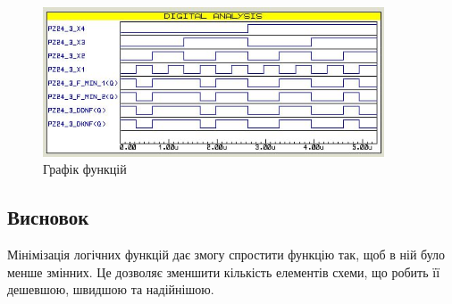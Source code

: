 \documentclass[12pt]{extarticle}
\begin{document}
\begin{figure}[H]
    \centering
    \includegraphics[width=0.90\textwidth]{graph.jpg}
    \caption{Графік функцій}
\end{figure}

\subsection*{Висновок}

Мінімізація логічних функцій дає змогу спростити функцію так, щоб 
в ній було менше змінних. Це дозволяє зменшити кількість елементів 
схеми, що робить її дешевшою, швидшою та надійнішою.
\end{document}
